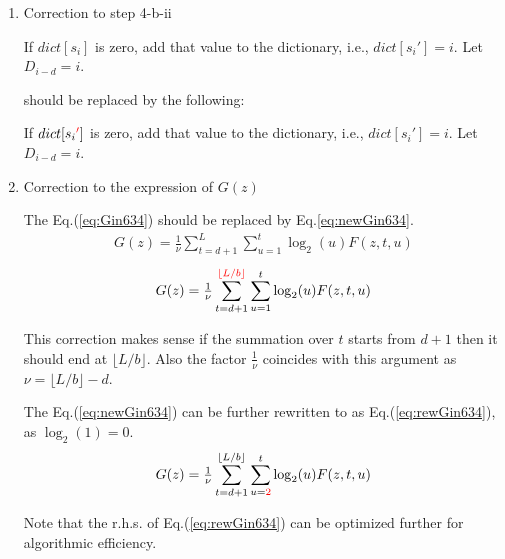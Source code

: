﻿\documentclass[a4paper,xelatex,english]{bxjsreport}
\begin{document}
\begin{enumerate}
	\item Correction to step 4-b-ii

\begin{shadebox}
\begin{algorithmic}
\State If $dict[s_{i}]$ is zero, add that value to the dictionary, i.e., $dict[s_{i}'] =i$. Let $D_{i-d} = i$.
\end{algorithmic}
\end{shadebox}
should be replaced by the following:
\begin{shadebox}
\begin{algorithmic}
\State If $dict[s_{i} \textcolor{red}{'}]$ is zero, add that value to the dictionary, i.e., $dict[s_{i}'] =i$. Let $D_{i-d} = i$.
\end{algorithmic}
\end{shadebox}

	\item Correction to the expression of $G(z)$

The Eq.(\ref{eq:Gin634}) should be replaced by Eq.\ref{eq:newGin634}.
\begin{align}
G(z) = \tfrac{1}{\nu} 
\sum_{t = d + 1}^{L} 
\sum_{u = 1}^{t} 
\log_{2}(u) F(z, t, u)  \label{eq:Gin634}
\end{align}
\begin{align}
G(z) = \tfrac{1}{\nu} 
\sum_{t = d + 1}^{ \textcolor{red}{\lfloor L / b \rfloor}} 
\sum_{u = 1}^{t} 
\log_{2}(u) F(z, t, u)  \label{eq:newGin634}
\end{align}

This correction makes sense if the summation over $t$ starts from $d + 1$ then it should end at $\lfloor L / b \rfloor$.  Also the factor $\tfrac{1}{\nu}$ coincides with this argument as $\nu = \lfloor L / b \rfloor - d$.

The Eq.(\ref{eq:newGin634}) can be further rewritten to as Eq.(\ref{eq:rewGin634}), as $\log_{2}(1) = 0$.
\begin{align}
G(z) = \tfrac{1}{\nu} 
\sum_{t = d + 1}^{\lfloor L / b \rfloor} 
\sum_{u = \textcolor{red}{2}}^{t} 
\log_{2}(u) F(z, t, u)  \label{eq:rewGin634}
\end{align}

Note that the r.h.s. of Eq.(\ref{eq:rewGin634}) can be optimized further for algorithmic efficiency.
\end{enumerate}
\end{document}
